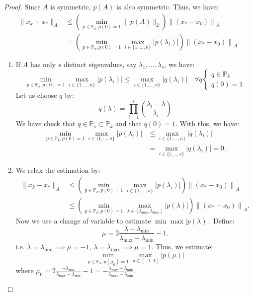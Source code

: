 \documentclass[../main/main.tex]{subfiles}
\begin{document}
\begin{proof}
  Since $A$ is symmetric, $p(A)$ is also symmetric. Thus, we have:
\begin{align*}
    \|x_{k}-x_{*}\|_{A} &\leq  \left( \min_{p\in \mathbb{P}_{k}, p(0)=1} \|p(A)\|_{2}\right) \left\|(x_{*}-x_{0})\right\|_{A}\\
  &=\left( \min_{p\in \mathbb{P}_{k}, p(0)=1}\max_{i \in \{1,\ldots  , n\}} |p(\lambda_{i})|\right) \left\|(x_{*}-x_{0})\right\|_{A}
  .\end{align*}
\begin{enumerate}
  \item If $A$ has only $s$ distinct eigenvalues, say $\lambda _{1}, \ldots  , \lambda _{s}$, we have: \[
 \min_{p\in \mathbb{P}_{k}, p(0)=1}\max_{i \in \{1,\ldots  , n\}} |p(\lambda_{i})| \leq  \max_{i \in  \{1, \ldots  , n\} }|q(\lambda_{i})| \quad  \forall q \begin{cases}
   q \in \mathbb{P}_{k}  \\
   q(0) = 1
 \end{cases}
        \]
        Let us choose $q$ by: \[
        q(\lambda) = \prod_{i=1}^s \left(\frac{\lambda _{i}-\lambda }{\lambda _{i}} \right)
        \]
        We have check that $q \in \mathbb{P}_{s}\subset \mathbb{P}_{k}$ and that $q(0)=1$. With this, we have: \begin{align*}
                                                                                                                 \min_{p\in \mathbb{P}_{k}, p(0)=1}\max_{i \in \{1,\ldots  , n\}} |p(\lambda_{i})|& \leq  \max_{i \in  \{1, \ldots  , n\} }|q(\lambda_{i})|\\
                                                                                                                 &= \max_{i \in \{ i, \ldots  , s\}} |q(\lambda_{i})| = 0 .\end{align*}
  \item We relax the estimation by:
        \begin{align*}
          \|x_{k}-x_{*}\|_{A} &\leq \left( \min_{p\in \mathbb{P}_{k}, p(0)=1}\max_{i \in \{1,\ldots  , n\}} |p(\lambda_{i})|\right) \left\|(x_{*}-x_{0})\right\|_{A} \\
          &\leq \left( \min_{p\in \mathbb{P}_{k}, p(0)=1}\max_{\lambda  \in [\lambda_{\min }, \lambda_{\max }]} |p(\lambda)|\right) \left\|(x_{*}-x_{0})\right\|_{A}
          .\end{align*}
        Now we use a change of variable to estimate $  \min\max |p(\lambda)| $. Define: \[
        \mu = 2 \frac{\lambda -\lambda _{\min }}{\lambda _{\max }-\lambda _{\min }} -1.
        \] i.e. $\lambda =\lambda _{\min }\implies \mu =-1 $, $\lambda =\lambda _{\max }\implies \mu =1$. Thus, we estimate: \[
 \min_{p\in \mathbb{P}_{k}, p(\mu_{0})=1}\max_{\mu  \in [-1,1]} |p(\mu)|
        \] where $\mu _{0} = 2 \frac{-\lambda _{\min }}{\lambda _{\max }-\lambda _{\min }} -1 = -\frac{\lambda _{\max }+\lambda _{\min }}{\lambda _{max}-\lambda _{\min }} $.\\


\end{enumerate}
\end{proof}
\end{document}
